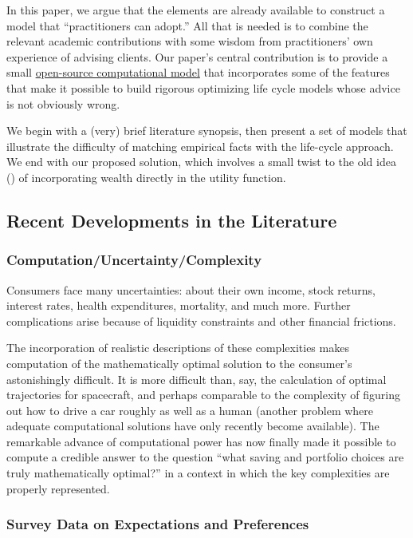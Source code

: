 \documentclass{article}
\begin{document}
In this paper, we argue that the elements are already available to construct a model that ``practitioners can adopt.''
All that is needed is to combine the relevant academic contributions with some wisdom from practitioners' own experience of advising clients.
Our paper's central contribution is to provide a small \href{https://github.com/econ-ark/life-cycle-prime-time}{open-source computational model} that incorporates some of the features that make it possible to build rigorous optimizing life cycle models whose advice is not obviously wrong.

We begin with a (very) brief literature synopsis, then present a set of models that illustrate the difficulty of matching empirical facts with the life-cycle approach.
We end with our proposed solution, which involves a small twist to the old idea (\cite{carrollWhyDoTheRich}) of incorporating wealth directly in the utility function.

\subsection{Recent Developments in the Literature}

\subsubsection{Computation/Uncertainty/Complexity}

Consumers face many uncertainties: about their own income, stock returns, interest rates, health expenditures, mortality, and much more.
Further complications arise because of liquidity constraints and other financial frictions.

The incorporation of realistic descriptions of these complexities makes computation of the mathematically optimal solution to the consumer's astonishingly difficult.
It is more difficult than, say, the calculation of optimal trajectories for spacecraft, and perhaps comparable to the complexity of figuring out how to drive a car roughly as well as a human (another problem where adequate computational solutions have only recently become available).
The remarkable advance of computational power has now finally made it possible to compute a credible answer to the question ``what saving and portfolio choices are truly mathematically optimal?'' in a context in which the key complexities are properly represented.

\subsubsection{Survey Data on Expectations and Preferences}
\end{document}
